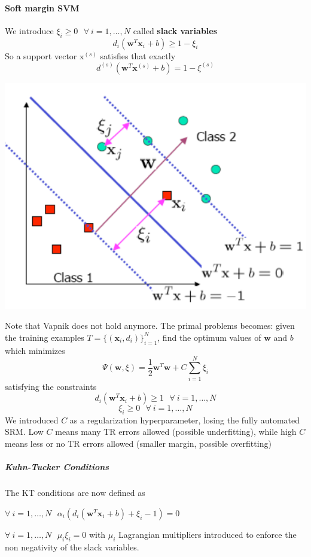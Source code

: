 \documentclass[10pt]{report}
\begin{document}
\paragraph{Soft margin SVM} We introduce $\xi_i\geq 0\:\:\:\forall\:i=1,\ldots, N$ called \textbf{slack variables} $$d_i(\mathbf{w}^T\mathbf{x}_i+b)\geq 1-\xi_i$$ So a support vector $\text{x}^{(s)}$ satisfies that exactly $$d^{(s)}(\mathbf{w}^T\mathbf{x}^{(s)}+b)= 1-\xi^{(s)}$$
\begin{center}
	\includegraphics[scale=0.5]{21.png}
\end{center}
Note that Vapnik does not hold anymore. The primal problems becomes: given the training examples $T = \{(\mathbf{x}_i, d_i)\}_{i=1}^N$, find the optimum values of $\mathbf{w}$ and $b$ which minimizes $$\Psi(\mathbf{w}, \xi) = \frac{1}{2}\mathbf{w}^T\mathbf{w} + C\sum_{i=1}^N\xi_i$$ satisfying the constraints $$d_i(\mathbf{w}^T\mathbf{x}_i+b)\geq 1\:\:\:\forall\:i=1,\ldots,N$$ $$\xi_i\geq 0\:\:\:\forall\:i=1,	\ldots, N$$
We introduced $C$ as a regularization hyperparameter, losing the fully automated SRM. Low $C$ means many TR errors allowed (possible underfitting), while high $C$ means less or no TR errors allowed (smaller margin, possible overfitting)
\subparagraph{Kuhn-Tucker Conditions} The KT conditions are now defined as
\begin{list}{}{}
	\item $\forall\:i=1,\ldots,N\:\:\:\alpha_i(d_i(\mathbf{w}^T\mathbf{x}_i + b)+\xi_i - 1) = 0$
	\item $\forall\:i=1,\ldots,N\:\:\:\mu_i\xi_i=0$ with $\mu_i$ Lagrangian multipliers introduced to enforce the non negativity of the slack variables.
\end{list}
\end{document}
